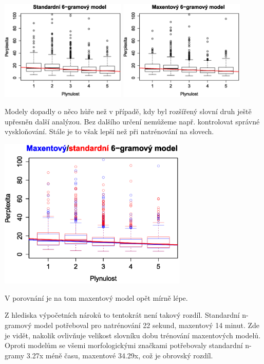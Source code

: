 \documentclass[12pt,a4paper]{report}
\begin{document}
\begin{center}
	\includegraphics[width=60mm]{./grafy/morf/ngram/rsd.svg.eps}
	\includegraphics[width=60mm]{./grafy/morf/maxent/rsd.svg.eps}
\end{center}
Modely dopadly o něco hůře než v případě, kdy byl rozšířený slovní druh ještě upřesněn další analýzou. Bez dalšího určení nemůžeme např. kontrolovat správné vyskloňování. Stále je to však lepší než při natrénování na slovech.
\begin{center}
	\includegraphics[width=90mm]{./grafy/morf/porovnani/rsd.svg.eps}	
\end{center}
V porovnání je na tom maxentový model opět mírně lépe.

Z hlediska výpočetních nároků to tentokrát není takový rozdíl. Standardní n-gramový model potřeboval pro natrénování 22 sekund, maxentový 14 minut. Zde je vidět, nakolik ovlivňuje velikost slovníku dobu trénování maxentových modelů. Oproti modelům se všemi morfologickými značkami potřebovaly standardní n-gramy 3.27x méně času, maxentové 34.29x, což je obrovský rozdíl.
\end{document}
